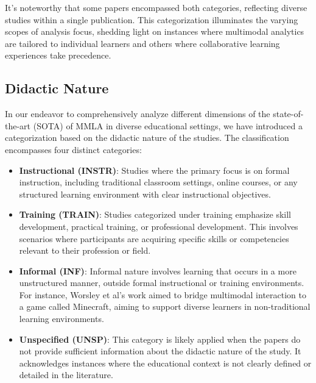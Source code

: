 \documentclass[manuscript,screen,review]{acmart}
\begin{document}
 It's noteworthy that some papers encompassed both categories, reflecting diverse studies within a single publication\cite{1326191931, 3637456466}. This categorization illuminates the varying scopes of analysis focus, shedding light on instances where multimodal analytics are tailored to individual learners and others where collaborative learning experiences take precedence.


\subsection{Didactic Nature} \label{subsec:didactic_nature}

In our endeavor to comprehensively analyze different dimensions of the state-of-the-art (SOTA) of MMLA in diverse educational settings, we have introduced a categorization based on the didactic nature of the studies. The classification encompasses four distinct categories: 

\begin{itemize}
    \item \textbf{Instructional (INSTR)}: Studies where the primary focus is on formal instruction, including traditional classroom settings, online courses, or any structured learning environment with clear instructional objectives.

    \item \textbf{Training (TRAIN)}: Studies categorized under training emphasize skill development, practical training, or professional development. This involves scenarios where participants are acquiring specific skills or competencies relevant to their profession or field.
    
    \item \textbf{Informal (INF)}: Informal nature involves learning that occurs in a more unstructured manner, outside formal instructional or training environments. For instance, Worsley et al's work \cite{666050348} aimed to bridge multimodal interaction to a game called Minecraft, aiming to support diverse learners in non-traditional learning environments. 
    
    \item \textbf{Unspecified (UNSP)}: This category is likely applied when the papers do not provide sufficient information about the didactic nature of the study. It acknowledges instances where the educational context is not clearly defined or detailed in the literature.
\end{itemize}
\end{document}
